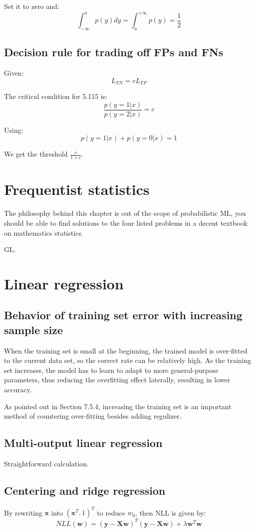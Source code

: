 \documentclass[UTF8]{ctexart}
\begin{document}
Set it to zero and:
$$\int_{-\infty}^{a}p(y)dy = \int_{a}^{+\infty}p(y) = \frac{1}{2}$$


\subsection{Decision rule for trading off FPs and FNs}
Given:
$$L_{FN}=cL_{FP}$$

The critical condition for 5.115 is:
$$\frac{p(y=1|x)}{p(y=2|x)} = c$$

Using:
$$p(y=1|x)+p(y=0|x)=1$$

We get the threshold $\frac{c}{1+c}$.

\newpage
\section{Frequentist statistics}
The philosophy behind this chapter is out of the scope of probabilistic ML, you should be able to find solutions to the four listed problems in a decent textbook on mathematics statistics. 

GL.

\newpage
\section{Linear regression}
\subsection{Behavior of training set error with increasing sample size}
When the training set is small at the beginning, the trained model is over-fitted to the current data set, so the correct rate can be relatively high. As the training set increases, the model has to learn to adapt to more general-purpose parameters, thus reducing the overfitting effect laterally, resulting in lower accuracy.

As pointed out in Section 7.5.4, increasing the training set is an important method of countering over-fitting besides adding regulizer.

\subsection{Multi-output linear regression}
Straightforward calculation.

\subsection{Centering and ridge regression}
By rewriting $\textbf{x}$ into $(\textbf{x}^T{},1)^{T}$ to reduce $w_{0}$, then NLL is given by:
$$NLL(\textbf{w})=(\textbf{y}-\textbf{X}\textbf{w})^{T}(\textbf{y}-\textbf{X}\textbf{w})+\lambda \textbf{w}^{T}\textbf{w}$$
\end{document}
